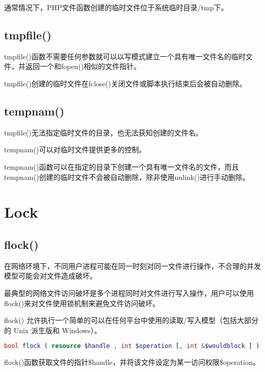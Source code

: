 通常情况下，PHP文件函数创建的临时文件位于系统临时目录/tmp下。


\subsection{tmpfile()}


tmpfile()函数不需要任何参数就可以以写模式建立一个具有唯一文件名的临时文件，并返回一个和fopen()相似的文件指针。

tmpfile()创建的临时文件在fclose()关闭文件或脚本执行结束后会被自动删除。

\subsection{tempnam()}


\begin{compactitem}
\item tmpfile()无法指定临时文件的目录，也无法获知创建的文件名。
\item tempnam()可以对临时文件提供更多的控制。
\end{compactitem}

tempnam()函数可以在指定的目录下创建一个具有唯一文件名的文件，而且tempnam()创建的临时文件不会被自动删除，除非使用unlink()进行手动删除。

\section{Lock}


\subsection{flock()}


在网络环境下，不同用户进程可能在同一时刻对同一文件进行操作，不合理的并发模型可能会对文件造成破坏。

最典型的网络文件访问破坏是多个进程同时对文件进行写入操作，用户可以使用flock()来对文件使用锁机制来避免文件访问破坏。


flock() 允许执行一个简单的可以在任何平台中使用的读取/写入模型（包括大部分的 Unix 派生版和 Windows）。

\begin{lstlisting}[language=PHP]
bool flock ( resource $handle , int $operation [, int &$wouldblock ] )
\end{lstlisting}



flock()函数获取文件的指针\$handle，并将该文件设定为某一访问权限\$operation。

